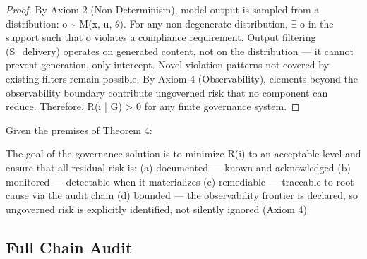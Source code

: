 \begin{proof}
By Axiom 2 (Non-Determinism), model output is sampled from a distribution: o \textasciitilde{} M(x, u, $\theta$).
For any non-degenerate distribution, $\exists$ o in the support such that o violates a compliance requirement.
Output filtering (S\_\allowbreak{}delivery) operates on generated content, not on the distribution --- it cannot prevent generation, only intercept.
Novel violation patterns not covered by existing filters remain possible.
By Axiom 4 (Observability), elements beyond the observability boundary contribute ungoverned risk that no component can reduce.
Therefore, R(i | G) > 0 for any finite governance system.

\end{proof}

\begin{ccor}
Given the premises of Theorem 4:

The goal of the governance solution is to minimize R(i) to an acceptable level and ensure that all residual risk is: (a) documented --- known and acknowledged (b) monitored --- detectable when it materializes (c) remediable --- traceable to root cause via the audit chain (d) bounded --- the observability frontier is declared, so ungoverned risk is explicitly identified, not silently ignored (Axiom 4)

\end{ccor}






\subsection{Full Chain Audit}


